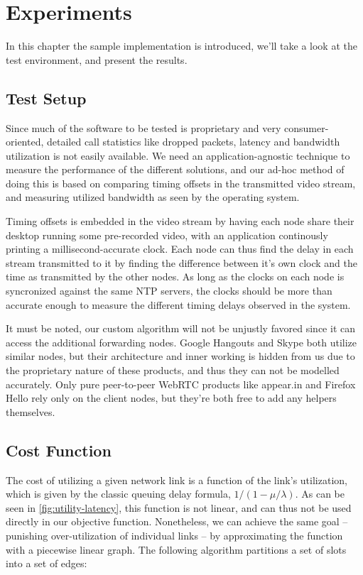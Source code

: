 \chapter{Experiments}\label{chp:experiments}

In this chapter the sample implementation is introduced, we'll take a look at the test environment, and present the results.

\section{Test Setup}

Since much of the software to be tested is proprietary and very consumer-oriented, detailed call statistics like dropped packets, latency and bandwidth utilization is not easily available. We need an application-agnostic technique to measure the performance of the different solutions, and our ad-hoc method of doing this is based on comparing timing offsets in the transmitted video stream, and measuring utilized bandwidth as seen by the operating system.

Timing offsets is embedded in the video stream by having each node share their desktop running some pre-recorded video, with an application continously printing a millisecond-accurate clock. Each node can thus find the delay in each stream transmitted to it by finding the difference between it's own clock and the time as transmitted by the other nodes. As long as the clocks on each node is syncronized against the same NTP servers, the clocks should be more than accurate enough to measure the different timing delays observed in the system.

It must be noted, our custom algorithm will not be unjustly favored since it can access the additional forwarding nodes. Google Hangouts and Skype both utilize similar nodes, but their architecture and inner working is hidden from us due to the proprietary nature of these products, and thus they can not be modelled accurately. Only pure peer-to-peer WebRTC products like appear.in and Firefox Hello rely only on the client nodes, but they're both free to add any helpers themselves.


\section{Cost Function}

The cost of utilizing a given network link is a function of the link's utilization, which is given by the classic queuing delay formula, $1/(1 - \mu/\lambda)$. As can be seen in \autoref{fig:utility-latency}, this function is not linear, and can thus not be used directly in our objective function. Nonetheless, we can achieve the same goal -- punishing over-utilization of individual links -- by approximating the function with a piecewise linear graph. The following algorithm partitions a set of slots into a set of edges:

